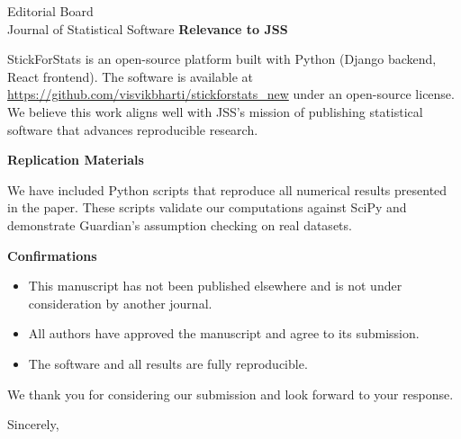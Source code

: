 \documentclass[11pt]{letter}
\begin{document}
\begin{letter}{Editorial Board\\Journal of Statistical Software}
\textbf{Relevance to JSS}

StickForStats is an open-source platform built with Python (Django backend, React frontend). The software is available at \url{https://github.com/visvikbharti/stickforstats_new} under an open-source license. We believe this work aligns well with JSS's mission of publishing statistical software that advances reproducible research.

\textbf{Replication Materials}

We have included Python scripts that reproduce all numerical results presented in the paper. These scripts validate our computations against SciPy and demonstrate Guardian's assumption checking on real datasets.

\textbf{Confirmations}

\begin{itemize}
    \item This manuscript has not been published elsewhere and is not under consideration by another journal.
    \item All authors have approved the manuscript and agree to its submission.
    \item The software and all results are fully reproducible.
\end{itemize}

We thank you for considering our submission and look forward to your response.

\closing{Sincerely,}

\end{letter}
\end{document}
